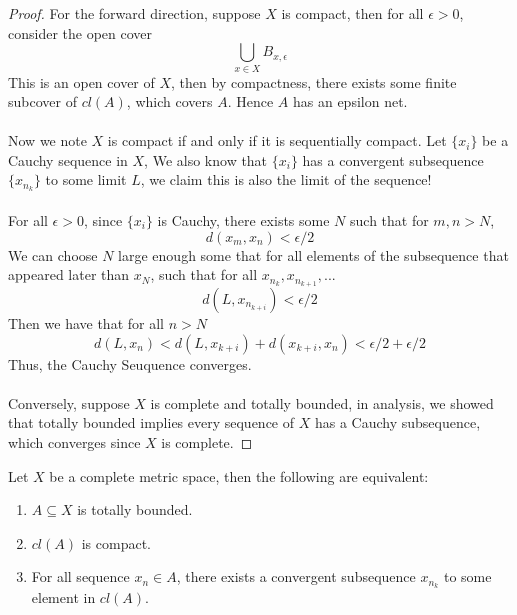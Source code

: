 \begin{proof}
    For the forward direction, suppose $X$ is compact, then for all $\epsilon > 0$, consider the open cover
    \[\bigcup_{x \in X} B_{x, \epsilon}\]
    This is an open cover of $X$, then by compactness, there exists some finite subcover of $cl(A)$, which covers $A$. Hence $A$ has an epsilon net.\\\\
    Now we note $X$ is compact if and only if it is sequentially compact. Let $\{x_i\}$ be a Cauchy sequence in $X$, We also know that $\{x_i\}$ has a convergent subsequence $\{x_{n_k}\}$ to some limit $L$, we claim this is also the limit of the sequence!\\\\
    For all $\epsilon > 0$, since $\{x_i\}$ is Cauchy, there exists some $N$ such that for $m, n > N$,
    \[d(x_m, x_n) < \epsilon/2\]
    We can choose $N$ large enough some that for all elements of the subsequence that appeared later than $x_N$, such that for all $x_{n_k}, x_{n_{k+1}}, ...$
    \[d(L, x_{n_{k+i}}) < \epsilon/2\]
    Then we have that for all $n > N$
    \[d(L, x_n) < d(L, x_{k+i}) + d(x_{k + i}, x_n) < \epsilon/2 + \epsilon/2\]
    Thus, the Cauchy Seuquence converges.\\\\
    Conversely, suppose $X$ is complete and totally bounded, in analysis, we showed that totally bounded implies every sequence of $X$ has a Cauchy subsequence, which converges since $X$ is complete.
\end{proof}

\begin{proposition}
    Let $X$ be a complete metric space, then the following are equivalent:
    \begin{enumerate}
        \item $A \subseteq X$ is totally bounded.
        \item $cl(A)$ is compact.
        \item For all sequence $x_n \in A$, there exists a convergent subsequence $x_{n_k}$ to some element in $cl(A)$.
    \end{enumerate}
\end{proposition}

